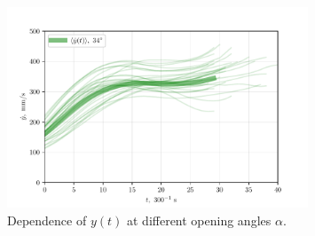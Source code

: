 \begin{figure}[htbp]
	\centering
	\includegraphics[width=0.8\textwidth]{figures/3)_dot_y_34.pdf}
	\caption{Dependence of $ y (t) $ at different opening angles $\alpha$.}
	\label{fig:label}
\end{figure}